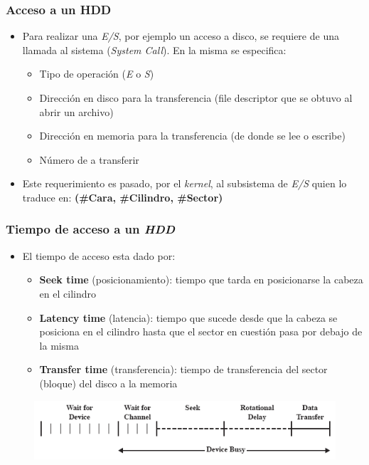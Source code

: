 \begin{frame}
  \frametitle{Acceso a un \textbf{HDD}}
  \begin{itemize}
    \item Para realizar una \emph{E/S}, por ejemplo un acceso a disco, se requiere de una llamada al sistema (\textit{System Call}). En la misma se especifica:
    \begin{itemize}
      \item Tipo de operación (\emph{E} o \emph{S})
      \item Dirección en disco para la transferencia (file descriptor que se obtuvo al abrir un archivo)
      \item Dirección en memoria para la transferencia (de donde se lee o escribe)
      \item Número de \bytes a transferir
    \end{itemize}
    \item Este requerimiento es pasado, por el \textit{kernel}, al subsistema de \emph{E/S} quien lo traduce en: \textbf{(\#Cara, \#Cilindro, \#Sector)}
  \end{itemize}
\end{frame}

\begin{frame}
  \frametitle{Tiempo de acceso a un \textit{HDD}}
  \begin{itemize}
    \item El tiempo de acceso esta dado por:
    \begin{itemize}
      \item \textbf{Seek time} (posicionamiento): tiempo que tarda en posicionarse la cabeza en el cilindro 
      \item \textbf{Latency time} (latencia): tiempo que sucede desde que la cabeza se posiciona en el cilindro hasta que el sector en cuestión pasa por debajo de la misma
      \item \textbf{Transfer time} (transferencia): tiempo de transferencia del sector (bloque) del disco a la memoria
    \end{itemize}    
  \end{itemize}
  \begin{figure}
      \includegraphics[scale=0.4]{images/dat.png}
  \end{figure}
\end{frame}

